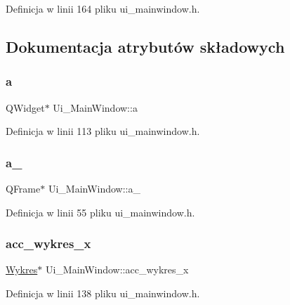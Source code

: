 Definicja w linii 164 pliku ui\+\_\+mainwindow.\+h.



\subsection{Dokumentacja atrybutów składowych}
\mbox{\label{class_ui___main_window_ab70b373357a746e70b5ef5b4814888b6}} 
\subsubsection{\texorpdfstring{a}{a}}
{\footnotesize\ttfamily Q\+Widget$\ast$ Ui\+\_\+\+Main\+Window\+::a}



Definicja w linii 113 pliku ui\+\_\+mainwindow.\+h.

\mbox{\label{class_ui___main_window_afb86e28eb82b9b69086f5a5e48175638}} 
\subsubsection{\texorpdfstring{a\+\_}{a\_3}}
{\footnotesize\ttfamily Q\+Frame$\ast$ Ui\+\_\+\+Main\+Window\+::a\+\_}



Definicja w linii 55 pliku ui\+\_\+mainwindow.\+h.

\mbox{\label{class_ui___main_window_a0c90f06928ad144d9e8b8935ed285b69}} 
\subsubsection{\texorpdfstring{acc\+\_\+wykres\+\_\+x}{acc\_wykres\_x}}
{\footnotesize\ttfamily \hyperlink{class_wykres}{Wykres}$\ast$ Ui\+\_\+\+Main\+Window\+::acc\+\_\+wykres\+\_\+x}



Definicja w linii 138 pliku ui\+\_\+mainwindow.\+h.

